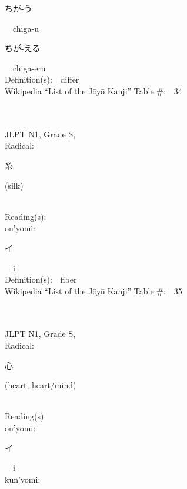 \begin{multicols}{2}
{\hspace*{2em}}{\begin{CJK}{UTF8}{min} ちが-う \end{CJK}}\ \ chiga-u\ \ \\
{\hspace*{2em}}{\begin{CJK}{UTF8}{min} ちが-える \end{CJK}}\ \ chiga-eru\ \ \\
Definition(s):\ \ differ \\
Wikipedia ``List of the J\=oy\=o Kanji'' Table \#:\ \ 34 \\
\ \ \\
{\fontsize{34pt}{40pt}  }\ \ \\
{JLPT N1, Grade S, \\Radical:\ \ {\begin{CJK}{UTF8}{min} 糸 \end{CJK}} (silk) } \\
Reading(s):\ \ \\
{\hspace*{1em}}on'yomi:\ \ \\
{\hspace*{2em}}{\begin{CJK}{UTF8}{min} イ \end{CJK}}\ \ i\ \ \\
Definition(s):\ \ fiber \\
Wikipedia ``List of the J\=oy\=o Kanji'' Table \#:\ \ 35 \\
\ \ \\
{\fontsize{34pt}{40pt}  }\ \ \\
{JLPT N1, Grade S, \\Radical:\ \ {\begin{CJK}{UTF8}{min} 心 \end{CJK}} (heart, heart/mind) } \\
Reading(s):\ \ \\
{\hspace*{1em}}on'yomi:\ \ \\
{\hspace*{2em}}{\begin{CJK}{UTF8}{min} イ \end{CJK}}\ \ i\ \ \\
{\hspace*{1em}}kun'yomi:\ \ \\

\end{multicols}
